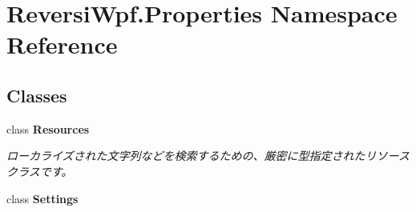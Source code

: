 \hypertarget{namespace_reversi_wpf_1_1_properties}{}\section{Reversi\+Wpf.\+Properties Namespace Reference}
\label{namespace_reversi_wpf_1_1_properties}
\subsection*{Classes}
\begin{DoxyCompactItemize}
\item 
class {\bfseries Resources}
\begin{DoxyCompactList}\small\item\em ローカライズされた文字列などを検索するための、厳密に型指定されたリソース クラスです。 \end{DoxyCompactList}\item 
class {\bfseries Settings}
\end{DoxyCompactItemize}
